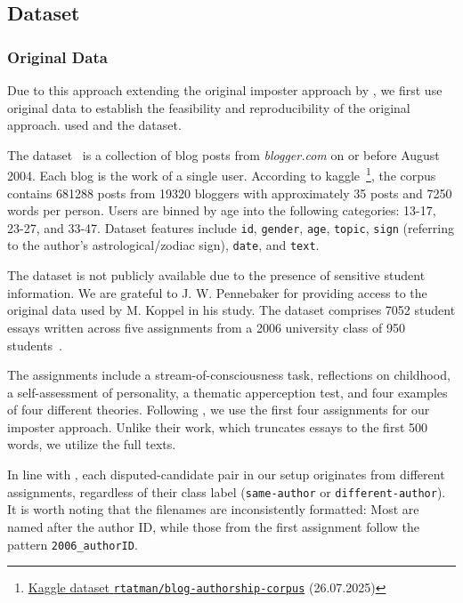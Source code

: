 \subsection{Dataset}
\label{subsec:dataset}

\subsubsection{Original Data}
Due to this approach extending the original imposter approach by \citet{koppel_determining_2014}, 
we first use original data to establish the feasibility and reproducibility of the original approach. 
\citet{koppel_determining_2014} used \dataBlog{} and the \dataStudent{} dataset.

The \dataBlog{} dataset~\citep{blog_dataset_2006} is a collection of blog posts from \textit{blogger.com} on or before August 2004.
Each blog is the work of a single user.
According to kaggle~\footnote{\href{https://www.kaggle.com/datasets/rtatman/blog-authorship-corpus?resource=download}{Kaggle dataset \texttt{rtatman/blog-authorship-corpus}} (26.07.2025)},
the corpus contains \num{681288} posts from \num{19320} bloggers with approximately 35 posts and \num{7250} words per person.
Users are binned by age into the following categories: 13-17, 23-27, and 33-47.
Dataset features include \texttt{id}, \texttt{gender}, \texttt{age}, \texttt{topic}, 
\texttt{sign} (referring to the author's astrological/zodiac sign), \texttt{date}, and \texttt{text}.

The \dataStudent{} dataset is not publicly available due to the presence of sensitive student information. 
We are grateful to J. W. Pennebaker for providing access to the original data used by M. Koppel in his study. 
The dataset comprises \num{7052} student essays written across five assignments from a 2006 university class of 950 students~\citep{koppel_determining_2014}.

The assignments include a stream-of-consciousness task, reflections on childhood, a self-assessment of personality, 
a thematic apperception test, and four examples of four different theories.
Following \citet{koppel_determining_2014}, we use the first four assignments for our imposter approach. 
Unlike their work, which truncates essays to the first 500 words, we utilize the full texts.

In line with \citet{koppel_determining_2014}, each disputed-candidate pair in our setup originates from different assignments, 
regardless of their class label (\texttt{same-author} or \texttt{different-author}).
It is worth noting that the filenames are inconsistently formatted: 
Most are named after the author ID, while those from the first assignment follow the pattern \texttt{2006\_authorID}.

